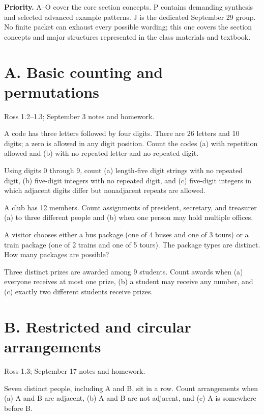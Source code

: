 \documentclass[11pt]{article}
\newcommand{\qid}[1]{\par\needspace{5\baselineskip}\noindent{\color{accent}\bfseries #1}\quad}
\newcommand{\source}[1]{{\small\color{muted}#1}\par}
\begin{document}
\textbf{Priority.} A--O cover the core section concepts. P contains demanding synthesis and selected advanced example patterns. J is the dedicated September 29 group. No finite packet can exhaust every possible wording; this one covers the section concepts and major structures represented in the class materials and textbook.

\clearpage
\section*{A. Basic counting and permutations}
\source{Ross 1.2--1.3; September 3 notes and homework.}
\qid{A1} A code has three letters followed by four digits. There are 26 letters and 10 digits; a zero is allowed in any digit position. Count the codes (a) with repetition allowed and (b) with no repeated letter and no repeated digit.
\par\vspace{0.40in}

\qid{A2} Using digits 0 through 9, count (a) length-five digit strings with no repeated digit, (b) five-digit integers with no repeated digit, and (c) five-digit integers in which adjacent digits differ but nonadjacent repeats are allowed.
\par\vspace{0.40in}

\qid{A3} A club has 12 members. Count assignments of president, secretary, and treasurer (a) to three different people and (b) when one person may hold multiple offices.
\par\vspace{0.40in}

\qid{A4} A visitor chooses either a bus package (one of 4 buses and one of 3 tours) or a train package (one of 2 trains and one of 5 tours). The package types are distinct. How many packages are possible?
\par\vspace{0.40in}

\qid{A5} Three distinct prizes are awarded among 9 students. Count awards when (a) everyone receives at most one prize, (b) a student may receive any number, and (c) exactly two different students receive prizes.
\par\vspace{0.40in}


\clearpage
\section*{B. Restricted and circular arrangements}
\source{Ross 1.3; September 17 notes and homework.}
\qid{B1} Seven distinct people, including A and B, sit in a row. Count arrangements when (a) A and B are adjacent, (b) A and B are not adjacent, and (c) A is somewhere before B.
\par\vspace{0.40in}
\end{document}

